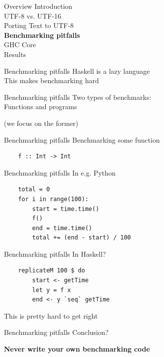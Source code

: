\documentclass[20pt]{beamer}
\newcommand{\vspaced}{
    \vspace{5mm}
}
\begin{document}

\begin{frame}{Overview}
    Introduction \\
    UTF-8 vs. UTF-16 \\
    Porting Text to UTF-8 \\
    \textbf{Benchmarking pitfalls} \\
    GHC Core \\
    Results
\end{frame}

\begin{frame}{Benchmarking pitfalls}
    Haskell is a lazy language \\
    This makes benchmarking hard
\end{frame}

\begin{frame}{Benchmarking pitfalls}
    Two types of benchmarks: \\
    Functions and programs \\
    \vspaced
    (we focus on the former)
\end{frame}

\begin{frame}[fragile]{Benchmarking pitfalls}
    Benchmarking some function

    \begin{lstlisting}
    f :: Int -> Int
    \end{lstlisting}
\end{frame}

\begin{frame}[fragile]{Benchmarking pitfalls}
    In e.g. Python
    \vspaced
    \begin{lstlisting}
    total = 0
    for i in range(100):
        start = time.time()
        f()
        end = time.time()
        total += (end - start) / 100
    \end{lstlisting}
\end{frame}

\begin{frame}[fragile]{Benchmarking pitfalls}
    In Haskell?
    \vspaced
    \begin{lstlisting}
    replicateM 100 $ do
        start <- getTime
        let y = f x
        end <- y `seq` getTime
    \end{lstlisting}
    \vspaced
    This is pretty hard to get right
\end{frame}

\begin{frame}{Benchmarking pitfalls}
    Conclusion? \\
    \vspaced
    \textbf{Never write your own benchmarking code}
\end{frame}
\end{document}
